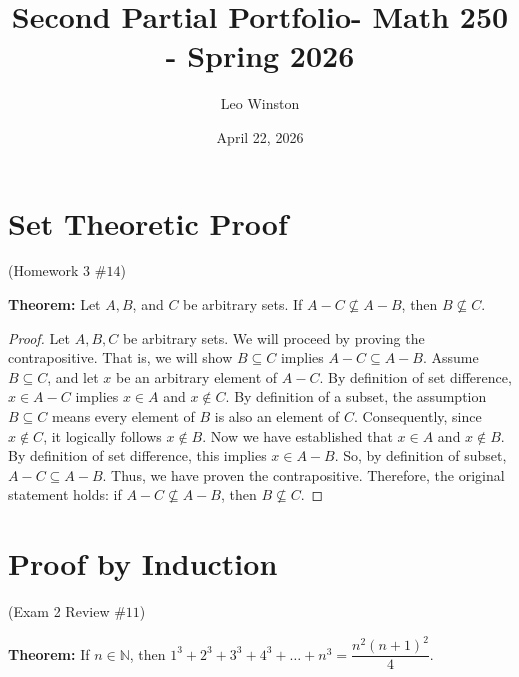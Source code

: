 \documentclass[12pt]{amsart}
\title{Second Partial Portfolio- Math 250 - Spring 2026}
\author{Leo Winston}
\date{April 22, 2026}
\begin{document}
\maketitle
\section{Set Theoretic Proof}
{\begin{center}(Homework 3 $\#14$)\end{center}}
\textbf{Theorem:}{ Let $A, B$, and $C$ be arbitrary sets. If $A-C \nsubseteq A-B$, then $B \nsubseteq C$.}
\begin{proof}
Let $A, B, C$ be arbitrary sets. We will proceed by proving the contrapositive. That is, we will show $B \subseteq C$ implies $A-C \subseteq A-B$. Assume $B \subseteq C$, and let $x$ be an arbitrary element of $A - C$. By definition of set difference, $x \in A - C$ implies $x \in A$ and $x \not \in C$. By definition of a subset, the assumption $B \subseteq C$ means every element of $B$ is also an element of $C$. Consequently, since $x \notin C$, it logically follows $x \notin B$.
Now we have established that $x \in A$ and $x \notin B$. By definition of set difference, this implies $x \in A - B$. So, by definition of subset, $A - C \subseteq A - B$. Thus, we have proven the contrapositive. Therefore, the original statement holds: if $A - C \not\subseteq A - B$, then $ B \not\subseteq C$.
\end{proof}
\newpage

\section{Proof by Induction}
\begin{center}(Exam 2 Review $\#11$)\end{center}

\textbf{Theorem:} If $n \in \mathbb{N}$, then 
$1^3+2^3+3^3+4^3+\dots+n^3=\dfrac{n^2(n+1)^2}{4}$.
\end{document}
